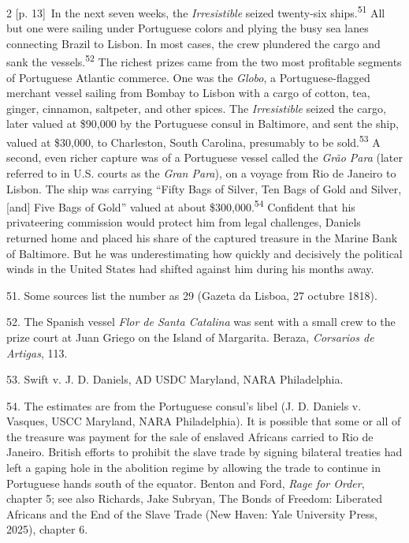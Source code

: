 \documentclass[10pt,a4paper]{article}
\begin{document}
\begin{paracol}{2}
{\scriptsize\color{gray} [p. 13]}\ In the next seven weeks, the \textit{Irresistible} seized twenty-six ships.\nobreak\textsuperscript{51} All but one were sailing under Portuguese colors and plying the busy sea lanes connecting Brazil to Lisbon. In most cases, the crew plundered the cargo and sank the vessels.\nobreak\textsuperscript{52} The richest prizes came from the two most profitable segments of Portuguese Atlantic commerce. One was the \textit{Globo}, a Portuguese-flagged merchant vessel sailing from Bombay to Lisbon with a cargo of cotton, tea, ginger, cinnamon, saltpeter, and other spices. The \textit{Irresistible} seized the cargo, later valued at \$90,000 by the Portuguese consul in Baltimore, and sent the ship, valued at \$30,000, to Charleston, South Carolina, presumably to be sold.\nobreak\textsuperscript{53} A second, even richer capture was of a Portuguese vessel called the \textit{Grão Para} (later referred to in U.S. courts as the \textit{Gran Para}), on a voyage from Rio de Janeiro to Lisbon. The ship was carrying “Fifty Bags of Silver, Ten Bags of Gold and Silver, [and] Five Bags of Gold” valued at about \$300,000.\nobreak\textsuperscript{54} Confident that his privateering commission would protect him from legal challenges, Daniels returned home and placed his share of the captured treasure in the Marine Bank of Baltimore. But he was underestimating how quickly and decisively the political winds in the United States had shifted against him during his months away.\par{\small 51. Some sources list the number as 29 (Gazeta da Lisboa, 27 octubre 1818).\par}{\small 52. The Spanish vessel \textit{Flor de Santa Catalina} was sent with a small crew to the prize court at Juan Griego on the Island of Margarita. Beraza, \textit{Corsarios de Artigas}, 113.\par}{\small 53. Swift v. J. D. Daniels, AD USDC Maryland, NARA Philadelphia.\par}{\small 54. The estimates are from the Portuguese consul’s libel (J. D. Daniels v. Vasques, USCC Maryland, NARA Philadelphia). It is possible that some or all of the treasure was payment for the sale of enslaved Africans carried to Rio de Janeiro. British efforts to prohibit the slave trade by signing bilateral treaties had left a gaping hole in the abolition regime by allowing the trade to continue in Portuguese hands south of the equator. Benton and Ford, \textit{Rage for Order}, chapter 5; see also Richards, Jake Subryan, The Bonds of Freedom: Liberated Africans and the End of the Slave Trade (New Haven: Yale University Press, 2025), chapter 6.\par}
\switchcolumn*
\end{paracol}
\end{document}
